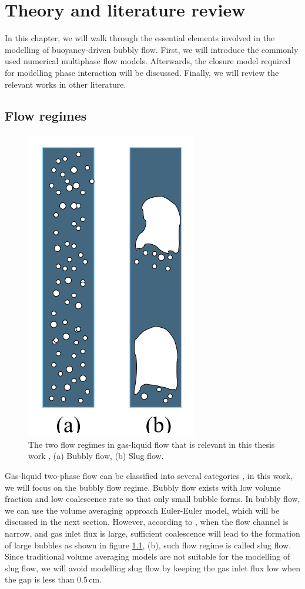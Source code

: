 \chapter{Theory and literature review}\label{theory}


In this chapter, we will walk through the essential elements involved in the modelling of buoyancy-driven bubbly flow. First, we will introduce the commonly used numerical multiphase flow models. Afterwards, the closure model required for modelling phase interaction will be discussed.  Finally, we will review the relevant works in other literature.

\section{Flow regimes}

\begin{figure}[H]
    \centering
    \includegraphics[scale=0.5]{regime.png}
    \caption{The two flow regimes in gas-liquid flow that is relevant in this thesis work \cite{Wetind2001}, (a) Bubbly flow, (b) Slug flow.}
    \label{regime}
\end{figure}


Gas-liquid two-phase flow can be classified into several categories \cite{Wetind2001}, in this work, we will focus on the bubbly flow regime. Bubbly flow exists with low volume fraction and low coalescence rate so that only small bubble forms. In bubbly flow, we can use the volume averaging approach Euler-Euler model, which will be discussed in the next section. However, according to \cite{Hine1980}, when the flow channel is narrow, and gas inlet flux is large, sufficient coalescence will lead to the formation of large bubbles as shown in figure \ref{regime}, (b), such flow regime is called slug flow. Since traditional volume averaging models are not suitable for the modelling of slug flow, we will avoid modelling slug flow by keeping the gas inlet flux low when the gap is less than $0.5 \,  \mathrm{cm}$.


